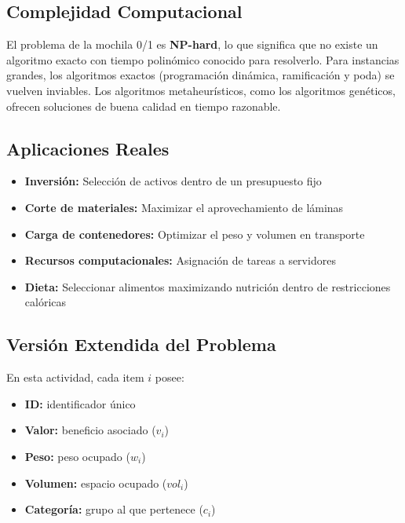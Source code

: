 \documentclass[12pt,a4paper]{article}
\begin{document}
\subsection{Complejidad Computacional}

El problema de la mochila 0/1 es \textbf{NP-hard}, lo que significa que no existe un algoritmo exacto con tiempo polin\'omico conocido para resolverlo. Para instancias grandes, los algoritmos exactos (programaci\'on din\'amica, ramificaci\'on y poda) se vuelven inviables. Los algoritmos metaheur\'isticos, como los algoritmos gen\'eticos, ofrecen soluciones de buena calidad en tiempo razonable.

\subsection{Aplicaciones Reales}

\begin{itemize}
  \item \textbf{Inversi\'on:} Selecci\'on de activos dentro de un presupuesto fijo
  \item \textbf{Corte de materiales:} Maximizar el aprovechamiento de l\'aminas
  \item \textbf{Carga de contenedores:} Optimizar el peso y volumen en transporte
  \item \textbf{Recursos computacionales:} Asignaci\'on de tareas a servidores
  \item \textbf{Dieta:} Seleccionar alimentos maximizando nutrici\'on dentro de restricciones cal\'oricas
\end{itemize}

\subsection{Versi\'on Extendida del Problema}

En esta actividad, cada item $i$ posee:

\begin{itemize}
  \item \textbf{ID:} identificador \'unico
  \item \textbf{Valor:} beneficio asociado ($v_i$)
  \item \textbf{Peso:} peso ocupado ($w_i$)
  \item \textbf{Volumen:} espacio ocupado ($vol_i$)
  \item \textbf{Categor\'ia:} grupo al que pertenece ($c_i$)
\end{itemize}
\end{document}
